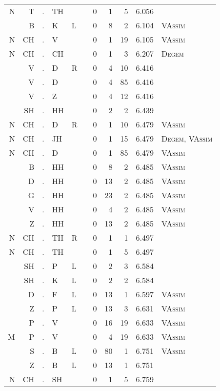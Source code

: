 \begin{longtable}{r@{ } r@{ } c@{ } l@{ } l@{ } l@{ } r r r r l }
N & T & . & TH &   &   & 0 & 1 & 5 & 6.056 &  \\
  & B & . & K & L &   & 0 & 8 & 2 & 6.104 & \textsc{VAssim} \\
N & CH & . & V &   &   & 0 & 1 & 19 & 6.105 & \textsc{VAssim} \\
N & CH & . & CH &   &   & 0 & 1 & 3 & 6.207 & \textsc{Degem} \\
  & V & . & D & R &   & 0 & 4 & 10 & 6.416 &  \\
  & V & . & D &   &   & 0 & 4 & 85 & 6.416 &  \\
  & V & . & Z &   &   & 0 & 4 & 12 & 6.416 &  \\
  & SH & . & HH &   &   & 0 & 2 & 2 & 6.439 &  \\
N & CH & . & D & R &   & 0 & 1 & 10 & 6.479 & \textsc{VAssim} \\
N & CH & . & JH &   &   & 0 & 1 & 15 & 6.479 & \textsc{Degem}, \textsc{VAssim} \\
N & CH & . & D &   &   & 0 & 1 & 85 & 6.479 & \textsc{VAssim} \\
  & B & . & HH &   &   & 0 & 8 & 2 & 6.485 & \textsc{VAssim} \\
  & D & . & HH &   &   & 0 & 13 & 2 & 6.485 & \textsc{VAssim} \\
  & G & . & HH &   &   & 0 & 23 & 2 & 6.485 & \textsc{VAssim} \\
  & V & . & HH &   &   & 0 & 4 & 2 & 6.485 & \textsc{VAssim} \\
  & Z & . & HH &   &   & 0 & 13 & 2 & 6.485 & \textsc{VAssim} \\
N & CH & . & TH & R &   & 0 & 1 & 1 & 6.497 &  \\
N & CH & . & TH &   &   & 0 & 1 & 5 & 6.497 &  \\
  & SH & . & P & L &   & 0 & 2 & 3 & 6.584 &  \\
  & SH & . & K & L &   & 0 & 2 & 2 & 6.584 &  \\
  & D & . & F & L &   & 0 & 13 & 1 & 6.597 & \textsc{VAssim} \\
  & Z & . & P & L &   & 0 & 13 & 3 & 6.631 & \textsc{VAssim} \\
  & P & . & V &   &   & 0 & 16 & 19 & 6.633 & \textsc{VAssim} \\
M & P & . & V &   &   & 0 & 4 & 19 & 6.633 & \textsc{VAssim} \\
  & S & . & B & L &   & 0 & 80 & 1 & 6.751 & \textsc{VAssim} \\
  & Z & . & B & L &   & 0 & 13 & 1 & 6.751 &  \\
N & CH & . & SH &   &   & 0 & 1 & 5 & 6.759 &  \\

\end{longtable}
